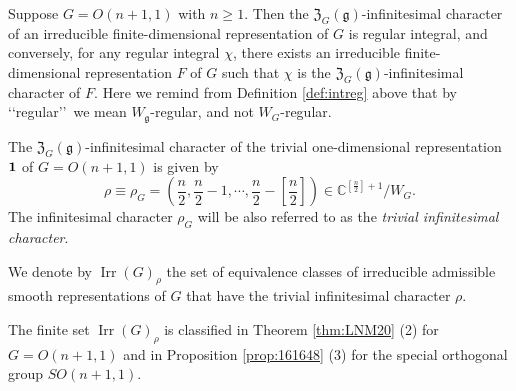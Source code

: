 \begin{remark}
\label{rem:Fregint}
Suppose $G=O(n+1,1)$ with $n \ge 1$.  
Then the ${\mathfrak{Z}}_G({\mathfrak{g}})$-infinitesimal character
 of an irreducible finite-dimensional representation 
 of $G$ is regular integral, 
 and conversely,
 for any regular integral $\chi$, 
 there exists an irreducible finite-dimensional representation $F$
 of $G$ such that $\chi$ is the ${\mathfrak{Z}}_G({\mathfrak{g}})$-infinitesimal character of $F$.  
Here we remind from Definition \ref{def:intreg}
 above that by \lq\lq{regular}\rq\rq\
 we mean $W_{\mathfrak{g}}$-regular,
 and not $W_G$-regular.  
\end{remark}

The ${\mathfrak{Z}}_G({\mathfrak{g}})$-infinitesimal character
 of the trivial one-dimensional representation ${\bf{1}}$ of $G=O(n+1,1)$ 
 is given by 
\begin{equation}
\label{eqn:rhoG}
     \rho 
\equiv 
     \rho_G =(\frac n 2, \frac n 2-1, \cdots, \frac n 2-[\frac n 2])
\in {\mathbb{C}}^{[\frac n 2]+1}/W_G.  
\end{equation}
The infinitesimal character $\rho_G$ will be also 
 referred to as the 
 {\it{trivial infinitesimal character}}.  
\begin{definition}
\label{def:Irrrho}
We denote by 
${\operatorname{Irr}}(G)_{\rho}$
 the set of equivalence classes
 of irreducible admissible smooth representations of $G$
 that have the trivial infinitesimal character $\rho$.  
\end{definition}
The finite set ${\operatorname{Irr}}(G)_{\rho}$ is classified 
 in Theorem \ref{thm:LNM20} (2)
 for $G=O(n+1,1)$
 and in Proposition \ref{prop:161648} (3)
 for the special orthogonal group $SO(n+1,1)$.  



